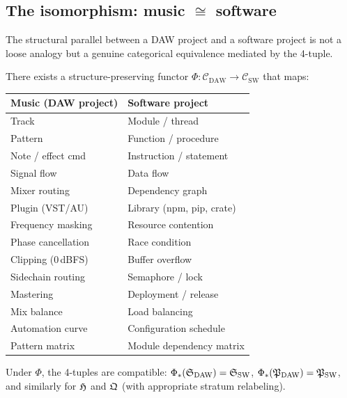 \subsection{The isomorphism: music \texorpdfstring{$\cong$}{≅}
  software}
\label{ssec:musical-iso}

The structural parallel between a DAW project and a software
project is not a loose analogy but a genuine categorical
equivalence mediated by the 4-tuple.

\begin{proposition}
\label{prop:daw-software}
There exists a structure-preserving functor
$\Phi \colon \mathcal{C}_{\mathrm{DAW}} \to
\mathcal{C}_{\mathrm{SW}}$ that maps:
\begin{center}
\renewcommand{\arraystretch}{1.2}
\begin{tabular}{@{}ll@{}}
\textbf{Music (DAW project)} & \textbf{Software project} \\
\hline
Track              & Module / thread \\
Pattern            & Function / procedure \\
Note / effect cmd  & Instruction / statement \\
Signal flow        & Data flow \\
Mixer routing      & Dependency graph \\
Plugin (VST/AU)    & Library (npm, pip, crate) \\
Frequency masking  & Resource contention \\
Phase cancellation & Race condition \\
Clipping (0\,dBFS) & Buffer overflow \\
Sidechain routing  & Semaphore / lock \\
Mastering          & Deployment / release \\
Mix balance        & Load balancing \\
Automation curve   & Configuration schedule \\
Pattern matrix     & Module dependency matrix \\
\end{tabular}
\end{center}
Under $\Phi$, the 4-tuples are compatible:
$\Phi_*(\mathfrak{S}_{\mathrm{DAW}}) = \mathfrak{S}_{\mathrm{SW}}$,
$\Phi_*(\mathfrak{P}_{\mathrm{DAW}}) = \mathfrak{P}_{\mathrm{SW}}$, and
similarly for $\mathfrak{H}$ and $\mathfrak{Q}$ (with appropriate stratum
relabeling).
\end{proposition}

